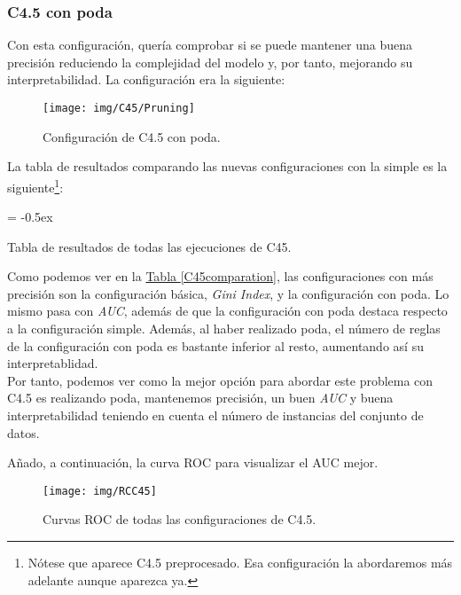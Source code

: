 \documentclass[paper=a4, fontsize=12pt]{article} %
\numberwithin{equation}{section} %
\numberwithin{figure}{section} %
\numberwithin{table}{section} %
\begin{document}
 \subsubsection {C4.5 con poda}
Con esta configuración, quería comprobar si se puede mantener una buena precisión reduciendo la complejidad del modelo y, por tanto, mejorando su interpretabilidad. La configuración era la siguiente:

	\begin{figure}[H]
	  \centering
	  \texttt{[image: img/C45/Pruning]}
	  \caption{Configuración de C4.5 con poda.}
	  \label{pruningC45}
	\end{figure}

La tabla de resultados comparando las nuevas configuraciones con la simple es la siguiente\footnote{Nótese que aparece C4.5 preprocesado. Esa configuración la abordaremos más adelante aunque aparezca ya.}:

	\extrarowheight = -0.5ex %
	\renewcommand{\arraystretch}{1.75} %
	\begin{table}[H]
		\begin{center}
		\end{center}
		\caption {Tabla de resultados de todas las ejecuciones de C45.}
		\label {C45comparation}
	\end{table}

Como podemos ver en la \hyperref[C45comparation]{Tabla \ref*{C45comparation}}, las configuraciones con más precisión son la configuración básica, \textit{Gini Index}, y la configuración con poda. Lo mismo pasa con \textit{AUC}, además de que la configuración con poda destaca respecto a la configuración simple. Además, al haber realizado poda, el número de reglas de la configuración con poda es bastante inferior al resto, aumentando así su interpretablidad. \\

Por tanto, podemos ver como la mejor opción para abordar este problema con C4.5 es realizando poda, mantenemos precisión, un buen \textit{AUC} y buena interpretabilidad teniendo en cuenta el número de instancias del conjunto de datos.

Añado, a continuación, la curva ROC para visualizar el AUC mejor.

	\begin{figure}[H]
	  \centering
	  \texttt{[image: img/RCC45]}
	  \caption{Curvas ROC de todas las configuraciones de C4.5.}
	  \label{curva_roc_c45}
	\end{figure}
\end{document}
